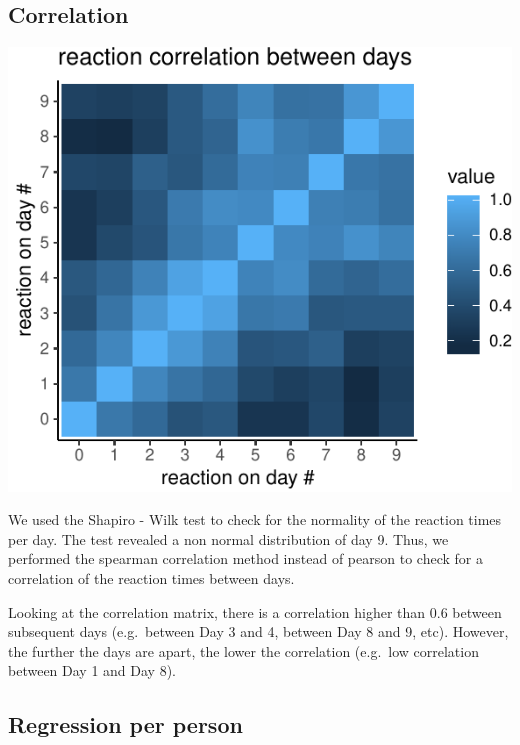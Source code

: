 \documentclass[
]{article}
\begin{document}
\hypertarget{correlation}{%
\subsection{Correlation}\label{correlation}}

\begin{center}\includegraphics{common_sleep_files/figure-latex/spearman_tile-1} \end{center}

We used the Shapiro - Wilk test to check for the normality of the
reaction times per day. The test revealed a non normal distribution of
day 9. Thus, we performed the spearman correlation method instead of
pearson to check for a correlation of the reaction times between days.

Looking at the correlation matrix, there is a correlation higher than
0.6 between subsequent days (e.g.~between Day 3 and 4, between Day 8 and
9, etc). However, the further the days are apart, the lower the
correlation (e.g.~low correlation between Day 1 and Day 8).

\hypertarget{regression-per-person}{%
\subsection{Regression per person}\label{regression-per-person}}
\end{document}
